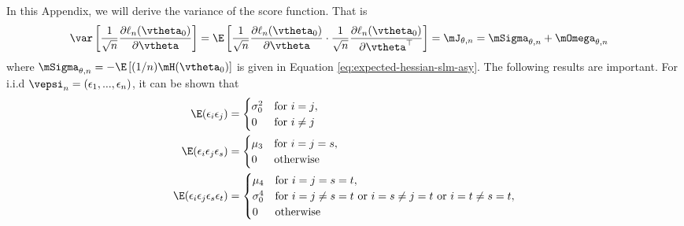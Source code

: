 \documentclass[english,12pt]{book}\usepackage[]{graphicx}\usepackage[]{xcolor}
\begin{document}
\begin{subappendices}
In this Appendix, we will derive the variance of the score function. That is
\begin{equation}
\begin{aligned}
 \var\left[\frac{1}{\sqrt{n}}\frac{\partial \ell_n (\vtheta_0)}{\partial \vtheta}\right] = \E\left[\frac{1}{\sqrt{n}}\frac{\partial \ell_n (\vtheta_0)}{\partial \vtheta}\cdot\frac{1}{\sqrt{n}}\frac{\partial \ell_n (\vtheta_0)}{\partial \vtheta^\top}\right] & = \mJ_{\theta, n} = \mSigma_{\theta, n} + \mOmega_{\theta, n}
  \end{aligned}
\end{equation}
%
where $\mSigma_{\theta, n}= - \E\left[(1/n)\mH(\vtheta_0)\right]$ is given in Equation \eqref{eq:expected-hessian-slm-asy}. The following results are important. For i.i.d $\vepsi_n = (\epsilon_1, ..., \epsilon_n)$, it can be shown that
\begin{equation}
\begin{aligned}
\E(\epsilon_i\epsilon_j) & = 
\begin{cases}
  \sigma_0^2 & \mbox{for $i = j$}, \\
  0          &  \mbox{for $i\neq j$}
\end{cases} \\
\E(\epsilon_i\epsilon_j\epsilon_s) & =
\begin{cases}
  \mu_3 & \mbox{for $i = j = s$}, \\
  0          &  \mbox{otherwise}
\end{cases} \\
\E(\epsilon_i\epsilon_j\epsilon_s\epsilon_t) & =
\begin{cases}
  \mu_4 & \mbox{for $i = j = s = t$}, \\
   \sigma_0^4          &  \mbox{for $i=j \neq s=t$ or $i =s\neq j= t$ or $i = t \neq s = t$}, \\
   0 & \mbox{otherwise}
\end{cases} \\
\end{aligned}
\end{equation}


\end{subappendices}
\end{document}
